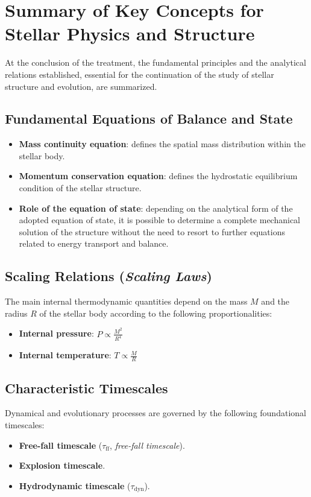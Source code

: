 \section{Summary of Key Concepts for Stellar Physics and Structure}

At the conclusion of the treatment, the fundamental principles and the analytical relations established, essential for the continuation of the study of stellar structure and evolution, are summarized.

\subsection{Fundamental Equations of Balance and State}
\begin{itemize}
\item \textbf{Mass continuity equation}: defines the spatial mass distribution within the stellar body.
\item \textbf{Momentum conservation equation}: defines the hydrostatic equilibrium condition of the stellar structure.
\item \textbf{Role of the equation of state}: depending on the analytical form of the adopted equation of state, it is possible to determine a complete mechanical solution of the structure without the need to resort to further equations related to energy transport and balance.
\end{itemize}

\subsection{Scaling Relations (\textit{Scaling Laws})}
The main internal thermodynamic quantities depend on the mass $M$ and the radius $R$ of the stellar body according to the following proportionalities:
\begin{itemize}
\item \textbf{Internal pressure}: $P \propto \frac{M^2}{R^4}$
\item \textbf{Internal temperature}: $T \propto \frac{M}{R}$
\end{itemize}

\subsection{Characteristic Timescales}
Dynamical and evolutionary processes are governed by the following foundational timescales:
\begin{itemize}
\item \textbf{Free-fall timescale} ($\tau_{\text{ff}}$, \textit{free-fall timescale}).
\item \textbf{Explosion timescale}.
\item \textbf{Hydrodynamic timescale} ($\tau_{\text{dyn}}$).
\end{itemize}

